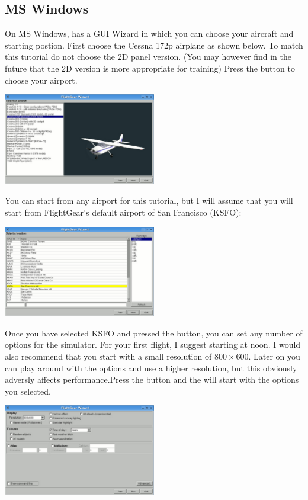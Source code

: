 \subsection{MS Windows}
    
On MS Windows, \FlightGear{} has a GUI Wizard in which you can choose your
aircraft and starting postion. First choose the Cessna 172p airplane as shown 
below. To match this tutorial do not choose the 2D panel version. 
(You may however find in the future that the 2D version is more appropriate 
for training) Press the  button to choose your airport.

\begin{center}
\includegraphics[width=0.5\textwidth]{img/tut_2}
\end{center}
    
You can start from any airport for this tutorial, but I will assume that you 
will start from FlightGear's default airport of San Francisco (KSFO):

\begin{center}
\includegraphics[width=0.5\textwidth]{img/tut_3}
\end{center}

Once you have selected KSFO and pressed the  button, you can set
any number of options for the simulator. For your first flight, I suggest
starting at noon. I would also recommend that you start with a small resolution
of $800\times600$. Later on you can play around with the options and use a
higher resolution, but this obviously adversly affects performance.Press the 
 button and the \FlightGear{} will start with the options you 
selected.

\begin{center}
\includegraphics[width=0.5\textwidth]{img/tut_4}
\end{center}

